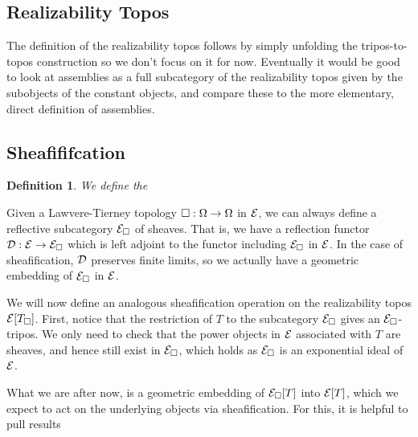 \documentclass[11pt]{article}
\newtheorem{defn}[thrm]{Definition}
\begin{document}
\subsection{Realizability Topos}%
\label{sub:realizability-topos}

The definition of the realizability topos follows by simply
unfolding the tripos-to-topos construction so we don't focus on it for now.
%
Eventually it would be good to look at assemblies as a full subcategory of the
realizability topos given by the subobjects of the constant objects, and
compare these to the more elementary, direct definition of assemblies.

\subsection{Sheafififcation}

\begin{defn}
  We define the 
\end{defn}


Given a Lawvere-Tierney topology \(\Box : \Omega \to \Omega\) in \(\mathcal{E}\), we
can always define a reflective subcategory \(\mathcal{E}_\Box\) of sheaves.
%
That is, we have a reflection functor \(\mathcal{D} : \mathcal{E} \to \mathcal{E}_\Box\) which is
left adjoint to the functor including \(\mathcal{E}_\Box\) in \(\mathcal{E}\).
%
In the case of sheafification, \(\mathcal{D}\) preserves finite limits,
so we actually have a geometric embedding of \(\mathcal{E}_\Box\) in \(\mathcal{E}\).


We will now define an analogous sheafification operation on
the realizability topos \({\mathcal{E}}[{T_\Box}]\).
%
First, notice that the restriction of \(T\) to the subcategory \(\mathcal{E}_\Box\) gives an
\(\mathcal{E}_\Box\)-tripos.
%
We only need to check that the power objects in \(\mathcal{E}\) associated with \(T\) are
sheaves, and hence still exist in \(\mathcal{E}_\Box\), which holds as \(\mathcal{E}_\Box\) is an
exponential ideal of \(\mathcal{E}\).

What we are after now, is a geometric embedding of \({\mathcal{E}_\Box}[{T}]\) into
\({\mathcal{E}}[{T}]\), which we expect to act on the underlying objects via
sheafification.
%
For this, it is helpful to pull results


%
\end{document}
